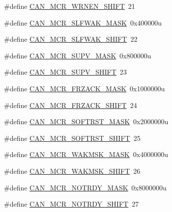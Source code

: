 \begin{DoxyCompactItemize}
\item 
\#define \hyperlink{group___c_a_n___register___masks_ga728f73a79721a9cc4b1b82ce6eaa74a7}{C\+A\+N\+\_\+\+M\+C\+R\+\_\+\+W\+R\+N\+E\+N\+\_\+\+S\+H\+I\+FT}~21
\item 
\#define \hyperlink{group___c_a_n___register___masks_gacf4f1d3d5d5eccf0f03f5f5ed4dc1bba}{C\+A\+N\+\_\+\+M\+C\+R\+\_\+\+S\+L\+F\+W\+A\+K\+\_\+\+M\+A\+SK}~0x400000u
\item 
\#define \hyperlink{group___c_a_n___register___masks_ga8dc0878396e4d4e4b73deec9cf23b0b1}{C\+A\+N\+\_\+\+M\+C\+R\+\_\+\+S\+L\+F\+W\+A\+K\+\_\+\+S\+H\+I\+FT}~22
\item 
\#define \hyperlink{group___c_a_n___register___masks_ga00521c6adbee738b0f73380052600203}{C\+A\+N\+\_\+\+M\+C\+R\+\_\+\+S\+U\+P\+V\+\_\+\+M\+A\+SK}~0x800000u
\item 
\#define \hyperlink{group___c_a_n___register___masks_ga5a448e496f0243c035ddcb70b8a07c4e}{C\+A\+N\+\_\+\+M\+C\+R\+\_\+\+S\+U\+P\+V\+\_\+\+S\+H\+I\+FT}~23
\item 
\#define \hyperlink{group___c_a_n___register___masks_gabec15eb427d7b249e72902c35bfc5f6e}{C\+A\+N\+\_\+\+M\+C\+R\+\_\+\+F\+R\+Z\+A\+C\+K\+\_\+\+M\+A\+SK}~0x1000000u
\item 
\#define \hyperlink{group___c_a_n___register___masks_ga666c7d11b911c7803d94b85ba54a05c3}{C\+A\+N\+\_\+\+M\+C\+R\+\_\+\+F\+R\+Z\+A\+C\+K\+\_\+\+S\+H\+I\+FT}~24
\item 
\#define \hyperlink{group___c_a_n___register___masks_gab9b1cfdb7014655d12f0a5ebafb3fc9b}{C\+A\+N\+\_\+\+M\+C\+R\+\_\+\+S\+O\+F\+T\+R\+S\+T\+\_\+\+M\+A\+SK}~0x2000000u
\item 
\#define \hyperlink{group___c_a_n___register___masks_gadff8b8b1d5645fca57a02109df3e507b}{C\+A\+N\+\_\+\+M\+C\+R\+\_\+\+S\+O\+F\+T\+R\+S\+T\+\_\+\+S\+H\+I\+FT}~25
\item 
\#define \hyperlink{group___c_a_n___register___masks_gac42f66e8828cd1923fee14d23ed99986}{C\+A\+N\+\_\+\+M\+C\+R\+\_\+\+W\+A\+K\+M\+S\+K\+\_\+\+M\+A\+SK}~0x4000000u
\item 
\#define \hyperlink{group___c_a_n___register___masks_gac10449abdadabddb4aef81457dfb7449}{C\+A\+N\+\_\+\+M\+C\+R\+\_\+\+W\+A\+K\+M\+S\+K\+\_\+\+S\+H\+I\+FT}~26
\item 
\#define \hyperlink{group___c_a_n___register___masks_ga013a34c0c5b808052d13ed4b9db2af75}{C\+A\+N\+\_\+\+M\+C\+R\+\_\+\+N\+O\+T\+R\+D\+Y\+\_\+\+M\+A\+SK}~0x8000000u
\item 
\#define \hyperlink{group___c_a_n___register___masks_ga90886e532a436fbd5b6e94e723acd148}{C\+A\+N\+\_\+\+M\+C\+R\+\_\+\+N\+O\+T\+R\+D\+Y\+\_\+\+S\+H\+I\+FT}~27

\end{DoxyCompactItemize}
